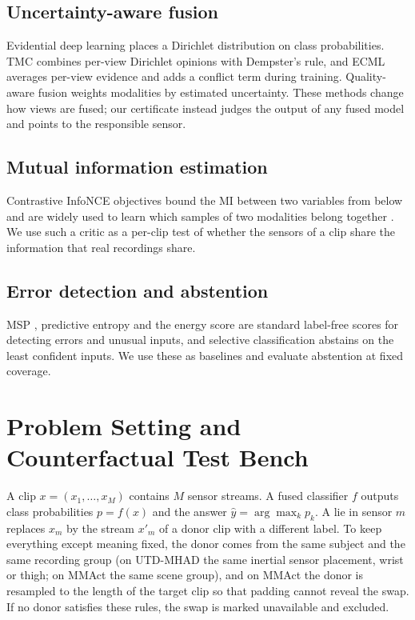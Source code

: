 \documentclass[conference]{IEEEtran}
\begin{document}
\subsection{Uncertainty-aware fusion}
Evidential deep learning \cite{Ref5} places a Dirichlet distribution on class probabilities. TMC \cite{Ref6} combines per-view Dirichlet opinions with Dempster's rule, and ECML \cite{Ref7} averages per-view evidence and adds a conflict term during training. Quality-aware fusion \cite{Ref10} weights modalities by estimated uncertainty. These methods change how views are fused; our certificate instead judges the output of any fused model and points to the responsible sensor.

\subsection{Mutual information estimation}
Contrastive InfoNCE objectives bound the MI between two variables from below \cite{Ref18,Ref19} and are widely used to learn which samples of two modalities belong together \cite{Ref20}. We use such a critic as a per-clip test of whether the sensors of a clip share the information that real recordings share.

\subsection{Error detection and abstention}
MSP \cite{Ref4}, predictive entropy and the energy score \cite{Ref11} are standard label-free scores for detecting errors and unusual inputs, and selective classification \cite{Ref12} abstains on the least confident inputs. We use these as baselines and evaluate abstention at fixed coverage.

\section{Problem Setting and Counterfactual Test Bench}

A clip $x=(x_1,\dots,x_M)$ contains $M$ sensor streams. A fused classifier $f$ outputs class probabilities $p=f(x)$ and the answer $\hat{y}=\arg\max_k p_k$. A lie in sensor $m$ replaces $x_m$ by the stream $x'_m$ of a donor clip with a different label. To keep everything except meaning fixed, the donor comes from the same subject and the same recording group (on UTD-MHAD the same inertial sensor placement, wrist or thigh; on MMAct the same scene group), and on MMAct the donor is resampled to the length of the target clip so that padding cannot reveal the swap. If no donor satisfies these rules, the swap is marked unavailable and excluded.
\end{document}

